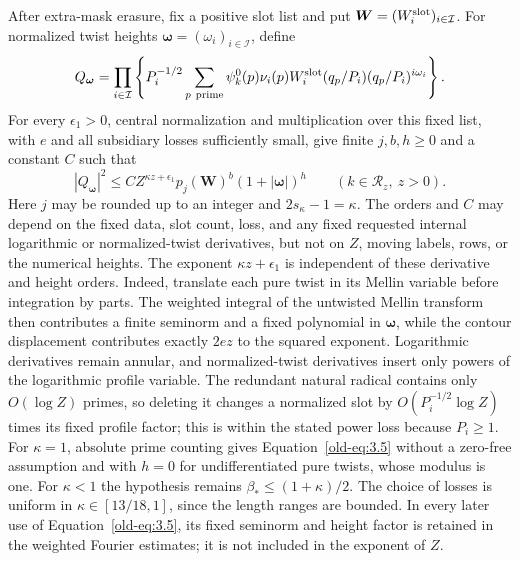 \documentclass[12pt]{article}
\begin{document}
After extra-mask erasure, fix a positive slot list and put
\(\boldsymbol W=(W_i^{\rm slot})_{i\in\mathcal I}\).  For normalized
twist heights \(\boldsymbol\omega=(\omega_i)_{i\in\mathcal I}\), define
\[
 Q_{\boldsymbol\omega}
 =\prod_{i\in\mathcal I}\left\{P_i^{-1/2}
   \sum_{p\ {\rm prime}}\psi_k^0(p)\nu_i(p)W_i^{\rm slot}(q_p/P_i)
                       (q_p/P_i)^{i\omega_i}\right\}.
\]
For every \(\epsilon_1>0\), central normalization and multiplication over this
fixed list, with \(e\) and all subsidiary losses sufficiently small,
give finite \(j,b,h\ge0\) and a constant \(C\) such that
\begin{equation}
 |Q_{\boldsymbol\omega}|^2
 \le C Z^{\kappa z+\epsilon_1}p_j(\boldsymbol W)^b
                 (1+|\boldsymbol\omega|)^h
 \qquad(k\in\mathcal R_z,\ z>0).
 \label{old-eq:3.5}
\end{equation}
Here \(j\) may be rounded up to an integer and \(2s_\kappa-1=\kappa\).
The orders and \(C\) may depend on the fixed data, slot count, loss,
and any fixed requested internal logarithmic or normalized-twist
derivatives, but not on \(Z\), moving labels, rows, or the numerical
heights.  The exponent \(\kappa z+\epsilon_1\) is independent of
these derivative and height orders.  Indeed, translate each pure twist
in its Mellin variable before integration by parts.  The weighted
integral of the untwisted Mellin transform then contributes a finite
seminorm and a fixed polynomial in \(\boldsymbol\omega\), while the
contour displacement contributes exactly \(2ez\) to the squared
exponent.  Logarithmic derivatives remain annular, and normalized-twist
derivatives insert only powers of the logarithmic profile variable.
The redundant natural radical contains
only \(O(\log Z)\) primes, so deleting it changes a normalized slot
by \(O(P_i^{-1/2}\log Z)\) times its fixed profile factor; this is
within the stated power loss because \(P_i\ge1\).  For \(\kappa=1\),
absolute prime counting gives Equation~\eqref{old-eq:3.5} without a
zero-free assumption and with \(h=0\) for undifferentiated pure twists,
whose modulus is one.  For \(\kappa<1\) the hypothesis remains
\(\beta_*\le(1+\kappa)/2\).  The choice of losses is uniform in
\(\kappa\in[13/18,1]\), since the length ranges are bounded.  In every
later use of Equation~\eqref{old-eq:3.5}, its fixed seminorm and height
factor is retained in the weighted Fourier estimates; it is not included
in the exponent of \(Z\).
\end{document}
